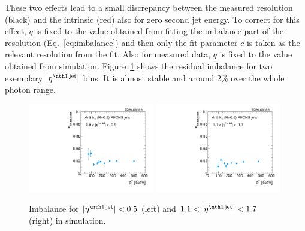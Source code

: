 These two effects lead to a small discrepancy between the measured resolution (black) and the intrinsic (red) also for zero second jet energy. 
To correct for this effect,  $q$ is fixed to the value obtained 
from fitting the imbalance part of the resolution (Eq.~\eqref{eq:imbalance}) and then only the fit parameter  $c$ is taken as the relevant resolution from the fit.
Also for measured data, $q$ is fixed to the value obtained from simulation. 
Figure~\ref{fig:ImbalanceOfPtgamma} shows the residual imbalance for two exemplary $|\etafirstjet|$ bins. 
It is almost stable and around 2\% over the whole photon \pt range.
\begin{figure}[!t]
  \centering
    \includegraphics[width=0.49\textwidth]{figures/resolution/methodology/Imbalance_for_1_eta_bin_PFCHS_mc_RMS99.pdf}
    \includegraphics[width=0.49\textwidth]{figures/resolution/methodology/Imbalance_for_3_eta_bin_PFCHS_mc_RMS99.pdf}
  \caption{Imbalance for $|\etafirstjet| < 0.5$ (left) and $1.1<|\etafirstjet| < 1.7$ (right) in simulation.}  
  \label{fig:ImbalanceOfPtgamma}
\end{figure}

